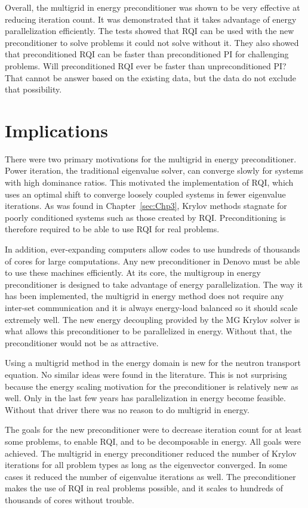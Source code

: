 Overall, the multigrid in energy preconditioner was shown to be very effective at reducing iteration count. It was demonstrated that it takes advantage of energy parallelization efficiently. The tests showed that RQI can be used with the new preconditioner to solve problems it could not solve without it. They also showed that preconditioned RQI can be faster than preconditioned PI for challenging problems. Will preconditioned RQI ever be faster than unpreconditioned PI? That cannot be answer based on the existing data, but the data do not exclude that possibility. 

\section{Implications}
There were two primary motivations for the multigrid in energy preconditioner. Power iteration, the traditional eigenvalue solver, can converge slowly for systems with high dominance ratios. This motivated the implementation of RQI, which uses an optimal shift to converge loosely coupled systems in fewer eigenvalue iterations. As was found in Chapter~\ref{sec:Chp3}, Krylov methods stagnate for poorly conditioned systems such as those created by RQI. Preconditioning is therefore required to be able to use RQI for real problems. 

In addition, ever-expanding computers allow codes to use hundreds of thousands of cores for large computations. Any new preconditioner in Denovo must be able to use these machines efficiently. At its core, the multigroup in energy preconditioner is designed to take advantage of energy parallelization. The way it has been implemented, the multigrid in energy method does not require any inter-set communication and it is always energy-load balanced so it should scale extremely well. The new energy decoupling provided by the MG Krylov solver is what allows this preconditioner to be parallelized in energy. Without that, the preconditioner would not be as attractive. 

Using a multigrid method in the energy domain is new for the neutron transport equation. No similar ideas were found in the literature. This is not surprising because the energy scaling motivation for the preconditioner is relatively new as well. Only in the last few years has parallelization in energy become feasible. Without that driver there was no reason to do multigrid in energy. 

The goals for the new preconditioner were to decrease iteration count for at least some problems, to enable RQI, and to be decomposable in energy. All goals were achieved. The multigrid in energy preconditioner reduced the number of Krylov iterations for all problem types as long as the eigenvector converged. In some cases it reduced the number of eigenvalue iterations as well. The preconditioner makes the use of RQI in real problems possible, and it scales to hundreds of thousands of cores without trouble. 



\separatorpage{}








